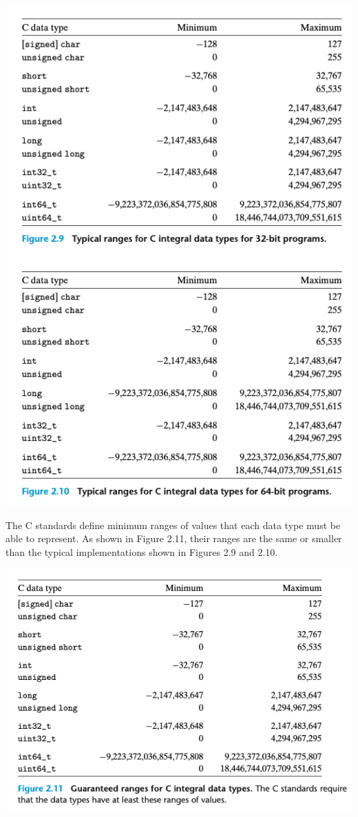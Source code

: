 \documentclass[11pt]{article}
\begin{document}
\begin{center}
\includegraphics[width=.9\linewidth]{pics/typical-range-for-c-integral-data-types.png}
\end{center}


The C standards define minimum ranges of values that each data type must be able to represent. As shown in Figure 2.11, their ranges are the same or smaller than the typical implementations shown in Figures 2.9 and 2.10.\\

\begin{center}
\includegraphics[width=.9\linewidth]{pics/guaranted-range-for-c-integral-data-types.png}
\end{center}
\end{document}
